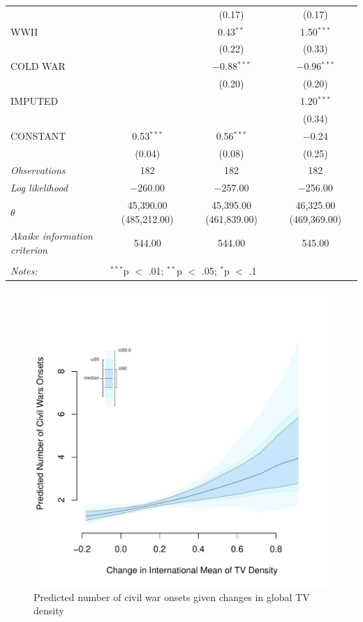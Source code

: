 \documentclass[11pt,article,oneside]{memoir}
\makeatletter
\def\maxwidth{\ifdim\Gin@nat@width>\linewidth\linewidth
\else\Gin@nat@width\fi}
\let\Oldincludegraphics\includegraphics
\renewcommand{\includegraphics}[1]{\Oldincludegraphics[width=\maxwidth]{#1}}
\makeatother
\begin{document}
\begin{table}[!htbp]
\begin{tabular}{@{\extracolsep{5pt}}lccc}
  &  & (0.17) & (0.17) \\ 
  WWII &  & 0.43$^{**}$ & 1.50$^{***}$ \\ 
  &  & (0.22) & (0.33) \\ 
  COLD WAR &  & $-$0.88$^{***}$ & $-$0.96$^{***}$ \\ 
  &  & (0.20) & (0.20) \\ 
  IMPUTED &  &  & 1.20$^{***}$ \\ 
  &  &  & (0.34) \\ 
  CONSTANT & 0.53$^{***}$ & 0.56$^{***}$ & $-$0.24 \\ 
  & (0.04) & (0.08) & (0.25) \\ 
 \textit{Observations} & 182 & 182 & 182 \\ 
\textit{Log likelihood} & $-$260.00 & $-$257.00 & $-$256.00 \\ 
$\theta$ & 45,390.00  (485,212.00) & 45,395.00  (461,839.00) & 46,325.00  (469,369.00) \\ 
\textit{Akaike information criterion} & 544.00 & 544.00 & 545.00 \\ 
\hline \\[-1.8ex] 
\textit{Notes:} & \multicolumn{3}{l}{$^{***}$p $<$ .01; $^{**}$p $<$ .05; $^{*}$p $<$ .1} \\ 
\end{tabular} 
\end{table}

\clearpage

\begin{figure} 
\includegraphics{figure/dtv_effect.pdf} 
\caption{Predicted number of civil war onsets given changes in global TV density} 
\label{myFigur} 
\end{figure}
\end{document}

